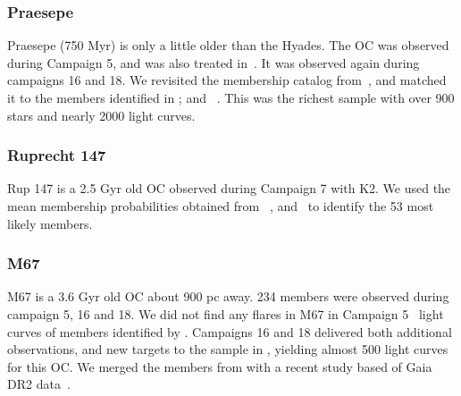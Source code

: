 \documentclass{aa}
\begin{document}
\subsubsection{Praesepe}
Praesepe (750 Myr) is only a little older than the Hyades. The OC was observed during Campaign 5, and was also treated in~. It was observed again during campaigns 16 and 18. We revisited the membership catalog from~\citet{douglas_praesepe_hyades_2014}, and matched it to the members identified in \citet{douglas_poking_2017, rebull_praesepe_2017,cantat_gaudin_2018}; and ~\citet{gaia_dr2_2018_hrd}. This was the richest sample with over 900 stars and nearly 2000 light curves.
\subsubsection{Ruprecht 147}
Rup 147 is a 2.5 Gyr old OC observed during Campaign 7 with K2. We used the mean membership probabilities obtained from ~\citet{curtis_ruprecht_2013, cantat_gaudin_2018, olivares_ngc6774_2019}, and~\citet{gaia_dr2_2018_hrd} to identify the 53 most likely members.
\subsubsection{M67}

M67 is a 3.6 Gyr old OC about 900 pc away. 234 members were observed during campaign 5, 16 and 18. We did not find any flares in M67 in Campaign 5~ light curves of members identified by \citet{gonzalez_m67mem_2016}. Campaigns 16 and 18 delivered both additional observations, and new targets to the sample in , yielding almost 500 light curves for this OC. We merged the members from \citet{gonzalez_m67mem_2016} with a recent study based of Gaia DR2 data~\citep{gao_m67mem_2018}.
\end{document}
